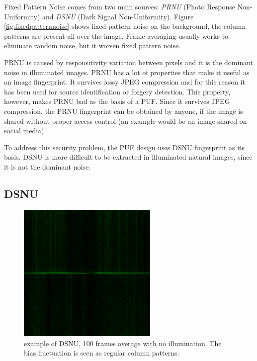 Fixed Pattern Noise comes from two main sources: \textit{PRNU} (Photo Response Non-Uniformity) and \textit{DSNU} (Dark Signal Non-Uniformity).
Figure \ref{fig:fixedpatternnoise} shows fixed pattern noise on the background, the column patterns are present all over the image. Frame averaging usually works to eliminate random noise, but it worsen fixed pattern noise.

PRNU is caused by responsitivity variation between pixels and it is the dominant noise in illuminated images. PRNU has a lot of properties that make it useful as an image fingerprint.
It survives lossy JPEG compression and for this reason it has been used for source identification or forgery detection. This property, however, makes PRNU bad as the basis of a PUF.
Since it survives JPEG compression, the PRNU fingerprint can be obtained by anyone, if the image is shared without proper access control (an example would be an image shared on social media).

To address this security problem, the PUF design uses DSNU fingerprint as its basis. DSNU is more difficult to be extracted in illuminated natural images, since it is not the dominant noise.

\subsection{DSNU}
\begin{figure}[h!]                      %
    \centering
    \includegraphics[width=0.6\textwidth]{images/DSNU.png}
    \caption{example of DSNU, 100 frames average with no illumination. The bias fluctuation is seen as regular column patterns.}
    \label{fig:dsnu}
\end{figure}

